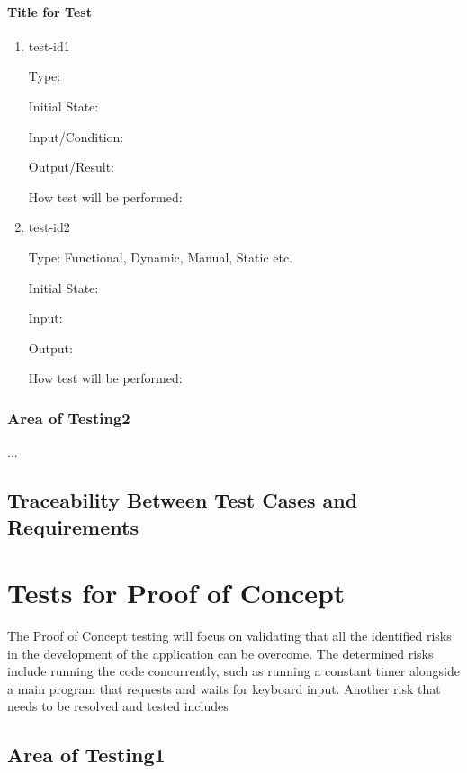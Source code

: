 \documentclass[12pt, titlepage]{article}
\begin{document}
\paragraph{Title for Test}

\begin{enumerate}

\item{test-id1\\}

Type: 
					
Initial State: 
					
Input/Condition: 
					
Output/Result: 
					
How test will be performed: 
					
\item{test-id2\\}

Type: Functional, Dynamic, Manual, Static etc.
					
Initial State: 
					
Input: 
					
Output: 
					
How test will be performed: 

\end{enumerate}

\subsubsection{Area of Testing2}

...

\subsection{Traceability Between Test Cases and Requirements}

\section{Tests for Proof of Concept}

The Proof of Concept testing will focus on validating that all the identified risks in the development of the application can be overcome. The determined risks include running the code concurrently, such as running a constant timer alongside a main program that requests and waits for keyboard input. Another risk that needs to be resolved and tested includes 

\subsection{Area of Testing1}
		
\end{document}
